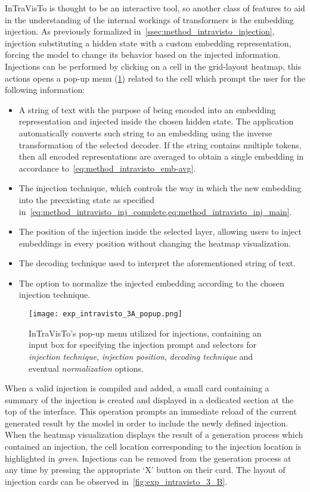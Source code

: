 InTraVisTo is thought to be an interactive tool, so another class of features to aid in the understanding of the internal workings of transformers is the embedding injection.
As previously formalized in~\cref{ssec:method_intravisto_injection}, injection  substituting a hidden state with a custom embedding representation, forcing the model to change its behavior based on the injected information.
Injections can be performed by clicking on a cell in the grid-layout heatmap, this actions opens a pop-up menu (\cref{fig:exp_intravisto_3_A}) related to the cell which prompt the user for the following information:
\begin{itemize}
    \item A string of text with the purpose of being encoded into an embedding representation and injected inside the chosen hidden state.
The application automatically converts such string to an embedding using the inverse transformation of the selected decoder.
If the string contains multiple tokens, then all encoded representations are averaged to obtain a single embedding in accordance to~\cref{eq:method_intravisto_emb-avg}.
    \item The injection technique, which controls the way in which the new embedding  into the preexisting state as specified in~\cref{eq:method_intravisto_inj_complete,eq:method_intravisto_inj_main}.
    \item The position of the injection inside the selected layer, allowing users to inject embeddings in every position without changing the heatmap visualization.
    \item The decoding technique used to interpret the aforementioned string of text.
    \item The option to normalize the injected embedding according to the chosen injection technique.
\end{itemize}

\begin{figure}[t!]
    \centering
    \texttt{[image: exp\_intravisto\_3A\_popup.png]}
    \caption[InTraVisTo's pop-up menu utilized for injections.]{InTraVisTo's pop-up menu utilized for injections, containing an input box for specifying the injection prompt and selectors for \emph{injection technique}, \emph{injection position}, \emph{decoding technique} and eventual \emph{normalization} options.}
    \label{fig:exp_intravisto_3_A}
\end{figure}

When a valid injection is compiled and added, a small card containing a summary of the injection is created and displayed in a dedicated section at the top of the interface.
This operation prompts an immediate reload of the current generated result by the model in order to include the newly defined injection.
When the heatmap visualization displays the result of a generation process which contained an injection, the cell location corresponding to the injection location is highlighted in \emph{green}.
Injections can be removed from the generation process at any time by pressing the appropriate `X' button on their card.
The  layout of injection cards can be observed in~\cref{fig:exp_intravisto_3_B}.


